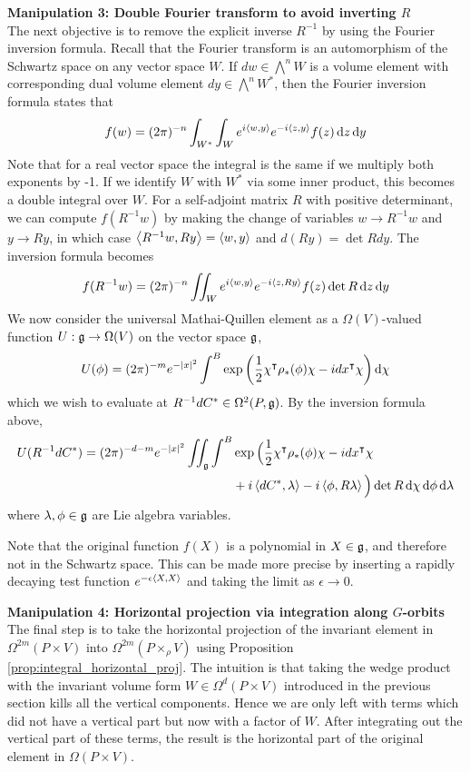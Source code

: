 \vspace{1ex}\noindent
\textbf{Manipulation 3: Double Fourier transform to avoid inverting $R$} \\
The next objective is to remove the explicit inverse $R^{-1}$ by using the
Fourier inversion formula. Recall that the Fourier transform is an automorphism
of the Schwartz space on any vector space $W$. If  $dw\in\bigwedge^n W$ is a
volume element with corresponding dual volume element $dy\in \bigwedge^nW^*$,
then the Fourier inversion formula states that 
\[
	f(w) =
	(2\pi)^{-n}\int_{W^*}\int_{W}e^{i\gen{w,y}}e^{-i\gen{z,y}}f(z)\odif{z}\odif{y}
\] 
Note that for a real vector space the integral is the same if we multiply both
exponents by -1.
If we identify $W$ with  $W^*$ via some inner product, this becomes a double
integral over $W$. For a self-adjoint matrix $R$ with positive determinant, we
can compute  $f(R^{-1}w)$ by making the change of variables $w \to R^{-1}w$ and
$y\to Ry$, in which case $\gen{R^{-1}w,Ry}=\gen{w,y}$ and $d(Ry)=\det R dy$. 
The inversion formula becomes
\[
f(R^{-1}w) = (2\pi)^{-n}\iint_W e^{i\gen{w,y}}e^{-i\gen{z,Ry}}f(z)\det R\odif{z}\odif{y}
\] 
We now consider the universal Mathai-Quillen element as a $\Omega(V)$-valued 
function $U:\operatorname{\mathfrak{g}} \to \Omega(V)$ on the vector space $\operatorname{\mathfrak{g}}$, 
\[
U(\phi) = (2\pi)^{-m}e^{-\abs{x}^2}\int^B
	\exp\paren{\frac{1}{2}\chi^{\intercal}\rho_*(\phi)\chi - idx^\intercal \chi}
	\odif{\chi}
\] 
which we wish to
evaluate at $R^{-1}dC^* \in \Omega^2(P,\operatorname{\mathfrak{g}})$. By the inversion formula above,
\begin{align} \label{eq:fourier_thom}
	U(R^{-1}dC^*) = (2\pi)^{-d-m}e^{-\abs{x}^2}\iint_{\g}\int^B 
	&\exp\Big(\frac{1}{2}\chi^{\intercal}\rho_*(\phi)\chi - idx^\intercal \chi\\
	&+i\gen{dC^*,\lambda}-i\gen{\phi,R\lambda}\Big) \det R
	\odif{\chi} \odif{\phi}\odif{\lambda} \nonumber
\end{align}
where $\lambda, \phi \in \operatorname{\mathfrak{g}}$ are Lie algebra variables. 
\begin{remark} %
	Note that the original function $f(X)$ is a polynomial in $X\in\operatorname{\mathfrak{g}}$, and
	therefore not in the Schwartz space. This can be made more precise by
	inserting a rapidly decaying test function $e^{-\epsilon\gen{X,X}}$ and
	taking the limit as $\epsilon\to 0$.
\end{remark}

\vspace{1ex}\noindent
\textbf{Manipulation 4: Horizontal projection via integration along $G$-orbits} \\
The final step is to take the horizontal projection of the invariant element in
$\Omega^{2m}(P\times V)$ into $\Omega^{2m}(P\times_\rho V)$ using Proposition
\ref{prop:integral_horizontal_proj}. 
The intuition is that taking the wedge product with the invariant 
volume form $W\in\Omega^d(P\times V)$ introduced in the previous section 
kills all the vertical components. Hence we are only left with
terms which did not have a vertical part but now with a factor of 
$W$. After integrating out the vertical part of these terms,  
the result is the horizontal part of the original element in
$\Omega(P\times V)$.

